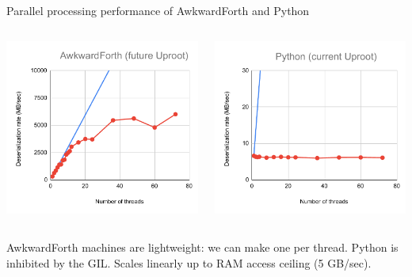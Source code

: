 \documentclass[aspectratio=169]{beamer}
\begin{document}
\begin{frame}{Parallel processing performance of AwkwardForth and Python}
\large
\vspace{0.2 cm}
\begin{columns}
\includegraphics[width=\linewidth]{AwkwardForth-scaling.pdf}

\includegraphics[width=\linewidth]{Python-scaling.pdf}
\end{columns}

AwkwardForth machines are lightweight: we can make one per thread. Python is inhibited by the GIL. Scales linearly up to RAM access ceiling (5 GB/sec).
\end{frame}
\end{document}
